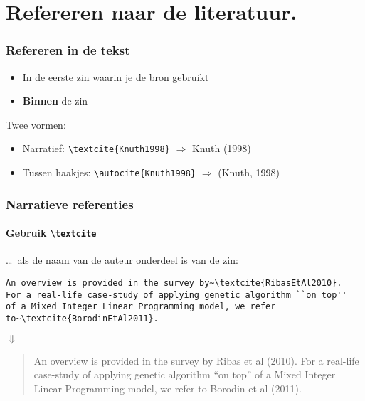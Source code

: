 \documentclass[aspectratio=169]{beamer}
\begin{document}
\section{Refereren naar de literatuur.}

\begin{frame}[fragile]
  \frametitle{Refereren in de tekst}

  \begin{itemize}
    \item In de eerste zin waarin je de bron gebruikt
    \item \textcolor{hgorange}{\textbf{Binnen}} de zin
  \end{itemize}

  \bigskip
  Twee vormen:

  \begin{itemize}
    \item Narratief: \verb|\textcite{Knuth1998}| \(\Rightarrow{}\) Knuth (1998)
    \item Tussen haakjes: \verb|\autocite{Knuth1998}| \(\Rightarrow{}\) (Knuth, 1998)
  \end{itemize}

\end{frame}

\begin{frame}
  \frametitle{Narratieve referenties}
  \framesubtitle{Gebruik \texttt{\textbackslash{}textcite}}

  \ldots\ als de naam van de auteur onderdeel is van de zin:

  \bigskip

  \small
  \begin{verbatim}
An overview is provided in the survey by~\textcite{RibasEtAl2010}.
For a real-life case-study of applying genetic algorithm ``on top''
of a Mixed Integer Linear Programming model, we refer
to~\textcite{BorodinEtAl2011}.
\end{verbatim}
  \normalsize

  \begin{center}
    $\Downarrow$
  \end{center}

  \begin{quotation}
    An overview is provided in the survey by Ribas et al (2010). For a real-life case-study of applying genetic algorithm ``on top'' of a Mixed Integer Linear Programming model, we refer to Borodin et al (2011).
  \end{quotation}
\end{frame}
\end{document}
